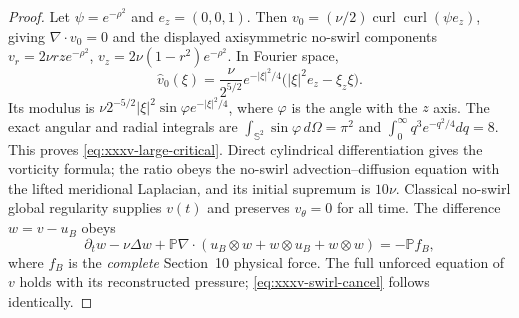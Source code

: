 \begin{proof}
Let $\psi=e^{-\rho^2}$ and $e_z=(0,0,1)$.
Then $v_0=(\nu/2)\operatorname{curl}
\operatorname{curl}(\psi e_z)$, giving
$\nabla\cdot v_0=0$ and the displayed
axisymmetric no-swirl components
$v_r=2\nu rz e^{-\rho^2}$,
$v_z=2\nu(1-r^2)e^{-\rho^2}$.
In Fourier space,
\[
\widehat v_0(\xi)=
\frac{\nu}{2^{5/2}}e^{-|\xi|^2/4}
\bigl(|\xi|^2e_z-\xi_z\xi\bigr).
\]
Its modulus is
$\nu 2^{-5/2}|\xi|^2\sin\varphi
e^{-|\xi|^2/4}$, where $\varphi$ is the angle
with the $z$ axis. The exact angular and radial
integrals are $\int_{\mathbb S^2}\sin\varphi\,d\Omega=\pi^2$
and $\int_0^\infty q^3e^{-q^2/4}dq=8$.
This proves \eqref{eq:xxxv-large-critical}.
Direct cylindrical differentiation gives the vorticity formula;
the ratio obeys the no-swirl advection--diffusion
equation with the lifted meridional Laplacian, and its
initial supremum is $10\nu$.
Classical no-swirl global regularity supplies $v(t)$ and
preserves $v_\theta=0$ for all time.
The difference $w=v-u_B$ obeys
\[
\partial_tw-\nu\Delta w+
\mathbb P\nabla\cdot
(u_B\otimes w+w\otimes u_B+w\otimes w)
=-\mathbb P f_B,
\]
where $f_B$ is the \emph{complete} Section~10 physical force.
The full unforced equation of $v$ holds with its reconstructed
pressure; \eqref{eq:xxxv-swirl-cancel} follows identically.
\end{proof}


